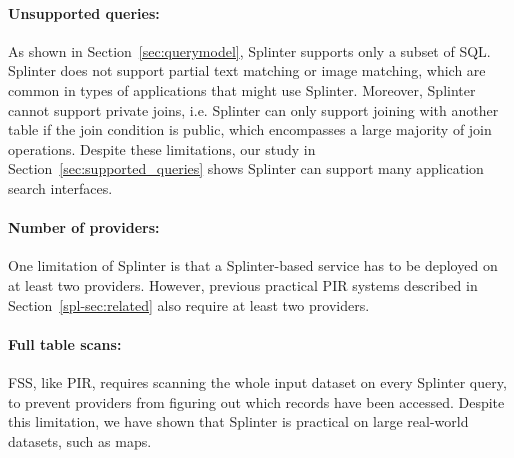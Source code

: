 \paragraph{Unsupported queries:}
As shown in Section~\ref{sec:querymodel}, Splinter supports only a subset of SQL.
Splinter does not support partial text matching or image matching, which are common in types of applications
that might use Splinter. Moreover, Splinter cannot support private joins, i.e. Splinter can only support joining with 
another table if the join condition is public, which encompasses a large majority of join operations. 
Despite these limitations, our study in Section~\ref{sec:supported_queries} 
shows Splinter can support many application search interfaces.

\paragraph{Number of providers:} 
One limitation of Splinter is that 
a Splinter-based service has 
to be deployed on at least two providers. 
However, previous practical PIR systems described in Section~\ref{spl-sec:related}
also require at least two providers. 



\paragraph{Full table scans:}
FSS, like PIR, requires scanning the whole input dataset on every Splinter query,
to prevent providers from figuring out which records have been accessed. 
Despite this limitation, we have shown that Splinter is practical
on large real-world datasets, such as maps.

